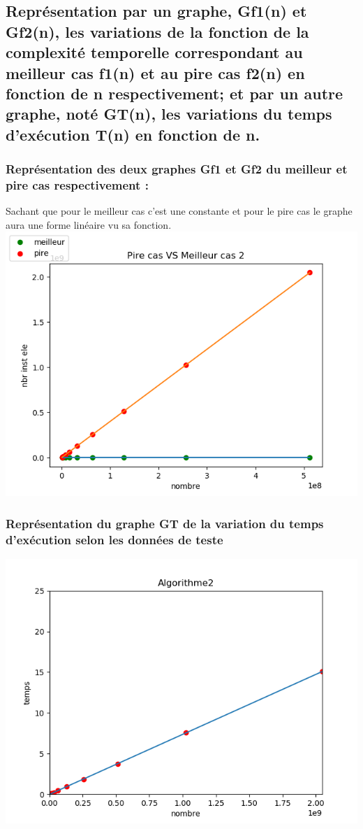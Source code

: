 \documentclass[12pt]{article}
\begin{document}
\subsection{Représentation par un graphe, Gf1(n) et Gf2(n), les variations de la fonction de la complexité temporelle correspondant au meilleur cas f1(n) et au pire cas f2(n) en fonction de n respectivement; et par un autre graphe, noté GT(n), les variations  du temps d'exécution T(n) en fonction de n.}


\subsubsection{Représentation des deux graphes Gf1 et Gf2 du meilleur et pire cas respectivement :}
Sachant que pour le meilleur cas c'est une constante et pour le pire cas le graphe aura une forme linéaire vu sa fonction.
\\
\includegraphics[width=1\textwidth]{graphe/Pire_VS_Meilleur_cas2.png}

\subsubsection{Représentation du graphe GT de la variation du temps d'exécution selon les données de teste}

\includegraphics[width=1\textwidth]{graphe/Algorithme2.png}
\end{document}
